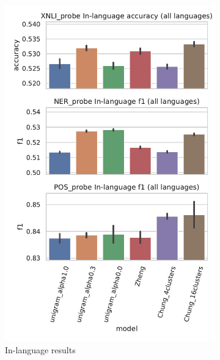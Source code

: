 \begin{figure}
    \centering
    \begin{subfigure}{.5\textwidth}
      \centering
      \includegraphics[width=\linewidth]{figures/probe_overall_inlanguage.pdf}
      \caption{In-language results}
      \label{fig:probe_overall_inlanguage}
    \end{subfigure}%
    \begin{subfigure}{.5\textwidth}
      \centering

\end{subfigure}
\end{figure}
